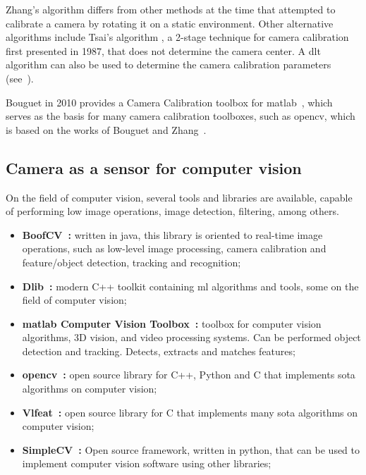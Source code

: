 Zhang's algorithm differs from other methods at the time that attempted to calibrate a camera by rotating it on a static environment. Other alternative algorithms include Tsai's algorithm \cite{Roger1987, mvg_book}, a 2-stage technique for camera calibration first presented in 1987, that does not determine the camera center. A \ac{dlt} algorithm can also be used to determine the camera calibration parameters (see~\cite{mvg_book}).

Bouguet in 2010 provides a Camera Calibration toolbox for \ac{matlab}~\cite{Bouguet2010}, which serves as the basis for many camera calibration toolboxes, such as \ac{opencv}, which is based on the works of Bouguet and Zhang~\cite{opencv}.


\subsection{Camera as a sensor for computer vision}
On the field of computer vision, several tools and libraries are available, capable of performing low image operations, image detection, filtering, among others. 

\begin{itemize}
	\item \textbf{BoofCV~\cite{boofcv}:} written in java, this library is oriented to real-time image operations, such as low-level image processing, camera calibration and feature/object  detection, tracking and recognition;
	\item \textbf{Dlib~\cite{dlib}:} modern C++ toolkit containing \acl{ml} algorithms and tools, some on the field of computer vision;
	\item \textbf{\ac{matlab} Computer Vision Toolbox\texttrademark~\cite{matlabcvtoolbox}:} toolbox for computer vision algorithms, 3D vision, and video processing systems. Can be performed object detection and tracking. Detects, extracts and matches features;
	\item \textbf{\acf{opencv}~\cite{opencv}:} open source library for C++, Python and C that implements \acl{sota} algorithms on computer vision;
	\item \textbf{Vlfeat~\cite{vlfeat}:} open source library for C that implements many \acl{sota} algorithms on computer vision;
	\item \textbf{SimpleCV~\cite{simplecv}:} Open source framework, written in python, that can be used to implement computer vision software using other libraries;
\end{itemize}

